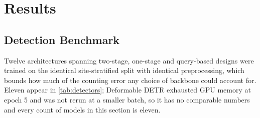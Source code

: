 \section{Results}
\label{sec:results}

\subsection{Detection Benchmark}
\label{sec:detection}

Twelve architectures spanning two-stage, one-stage and query-based designs were trained on
the identical site-stratified split with identical preprocessing, which bounds how much of the
counting error any choice of backbone could account for. Eleven appear in \cref{tab:detectors};
Deformable DETR exhausted GPU memory at epoch 5 and was not rerun at a smaller batch, so it has
no comparable numbers and every count of models in this section is eleven.

